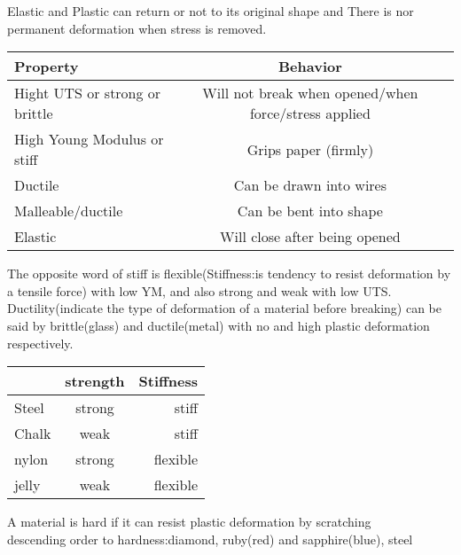 \documentclass[a4paper]{article}
\begin{document}
\begin{defi}
Elastic and Plastic can return or not to its original shape  and There is nor permanent deformation when stress is removed.
\end{defi}


\begin{defi}
\end{defi}
\begin{center}
\begin{tabular}{ |l| c| r| } \hline Property & Behavior  \\ \hline Hight UTS or strong or brittle & Will not break when opened/when force/stress applied  \\ \hline High Young Modulus or stiff & Grips paper (firmly)   \\ \hline Ductile & Can be drawn into wires\\ \hline Malleable/ductile & Can be bent into shape\\ \hline Elastic & Will close after being opened \\ \hline \end{tabular}
\end{center}

\begin{remark}
The opposite word of stiff is flexible(Stiffness:is tendency to resist deformation by a tensile force) with low YM, and also strong and weak with low UTS. Ductility(indicate the type of deformation of a material before breaking) can be said by brittle(glass) and ductile(metal) with no and high plastic deformation respectively.
\end{remark}

\begin{ex}
\end{ex}

\begin{center}
\begin{tabular}{ |l| c| r| } \hline & strength & Stiffness   \\ \hline Steel & strong & stiff \\ \hline Chalk & weak & stiff  \\ \hline nylon & strong & flexible \\ \hline jelly & weak & flexible \\ \hline  \end{tabular}
\end{center}

\begin{defi}[Hardness]
A material is hard if it can resist plastic deformation by scratching \\

descending order to hardness:diamond, ruby(red) and sapphire(blue), steel 
\end{defi}
\end{document}
